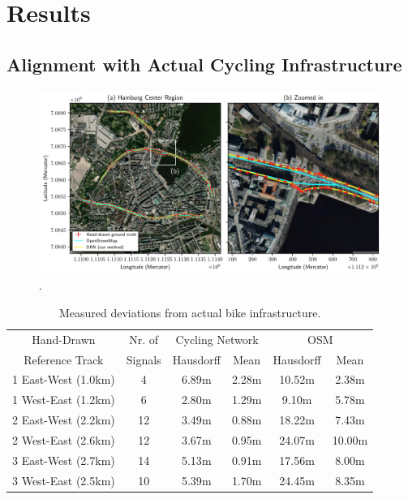 \section{Results}

\subsection{Alignment with Actual Cycling Infrastructure}

\begin{figure}[htbp]
\centering 
\includegraphics[width=\linewidth]{images/routing-hand-drawn-ground-truth.pdf}
\caption{.}
\label{fig:}
\end{figure}

\begin{table}[htbp]
\centering
\begin{tabular}{cccccc}
\hline
Hand-Drawn & Nr. of &\multicolumn{2}{c}{Cycling Network} & \multicolumn{2}{c}{OSM} \\
Reference Track & Signals & Hausdorff & Mean & Hausdorff & Mean \\ \hline
1 East-West ({1.0}{km}) & 4 & {6.89}{m} & {2.28}{m} & {10.52}{m} & {2.38}{m} \\
1 West-East ({1.2}{km}) & 6 &{2.80}{m} & {1.29}{m} & {9.10}{m} & {5.78}{m} \\
2 East-West ({2.2}{km}) & 12 & {3.49}{m} & {0.88}{m} & {18.22}{m} & {7.43}{m} \\
2 West-East ({2.6}{km}) & 12 & {3.67}{m} & {0.95}{m} & {24.07}{m}  & {10.00}{m} \\
3 East-West ({2.7}{km}) & 14 & {5.13}{m} & {0.91}{m} & {17.56}{m} & {8.00}{m} \\
3 West-East ({2.5}{km}) & 10 & {5.39}{m} & {1.70}{m} & {24.45}{m} & {8.35}{m} \\ \hline
\end{tabular}
\caption{Measured deviations from actual bike infrastructure.}%
\label{tab:accuracy-comparison}%
\end{table}

